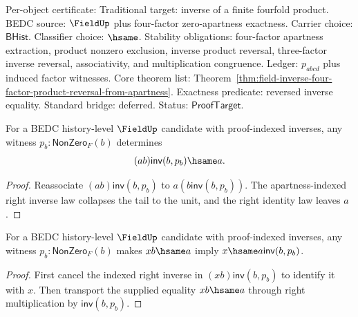 Per-object certificate: Traditional target: inverse of a finite fourfold
product. BEDC source: $\FieldUp$ plus four-factor zero-apartness exactness.
Carrier choice: $\mathsf{BHist}$. Classifier choice: $\hsame$. Stability
obligations: four-factor apartness extraction, product nonzero exclusion,
inverse product reversal, three-factor inverse reversal, associativity, and
multiplication congruence. Ledger: $p_{abcd}$ plus induced factor witnesses.
Core theorem list:
Theorem~\ref{thm:field-inverse-four-factor-product-reversal-from-apartness}.
Exactness predicate: reversed inverse equality. Standard bridge: deferred.
Status: $\mathsf{ProofTarget}$.

\begin{theorem}
\label{thm:field-mul-inverse-right-cancel-from-apartness}
For a BEDC history-level $\FieldUp$ candidate with proof-indexed inverses,
any witness $p_b:\mathsf{NonZero}_F(b)$ determines
$$
(a b)\mathsf{inv}(b,p_b)\hsame a.
$$
\end{theorem}
\begin{proof}
Reassociate $(a b)\mathsf{inv}(b,p_b)$ to
$a(b\mathsf{inv}(b,p_b))$. The apartness-indexed right inverse law collapses
the tail to the unit, and the right identity law leaves $a$.
\end{proof}

\begin{theorem}
\label{thm:field-right-mul-equation-solution-from-apartness}
For a BEDC history-level $\FieldUp$ candidate with proof-indexed inverses,
any witness $p_b:\mathsf{NonZero}_F(b)$ makes $xb\hsame a$ imply
$x\hsame a\mathsf{inv}(b,p_b)$.
\end{theorem}
\begin{proof}
First cancel the indexed right inverse in $(x b)\mathsf{inv}(b,p_b)$ to
identify it with $x$. Then transport the supplied equality $x b\hsame a$
through right multiplication by $\mathsf{inv}(b,p_b)$.
\end{proof}

